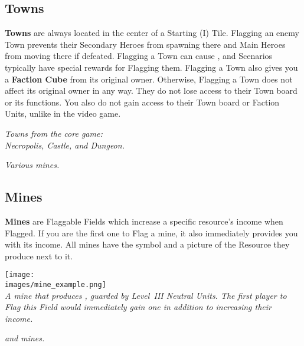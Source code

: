 \begin{multicols}{2}
\subsection*{Towns}
\textbf{Towns} are always located in the center of a Starting (I) Tile.
Flagging an enemy Town prevents their Secondary Heroes from spawning there and Main Heroes from moving there if defeated.
Flagging a Town can cause , and Scenarios typically have special rewards for Flagging them.
Flagging a Town also gives you a \textbf{Faction Cube} from its original owner.
Otherwise, Flagging a Town does not affect its original owner in any way.
They do not lose access to their Town board or its functions.
You also do not gain access to their Town board or Faction Units, unlike in the video game.

\begin{center}
  \textit{Towns from the core game:\\Necropolis, Castle, and Dungeon.}

  \vspace{1.8em}

  \textit{Various  mines.}
\end{center}

\columnbreak

\subsection*{Mines}
{\textbf{Mines}} are Flaggable Fields which increase a specific resource's income when Flagged.
If you are the first one to Flag a mine, it also immediately provides you with its income.
All mines have the  symbol and a picture of the Resource they produce next to it.

\begin{center}
  \texttt{[image: \\images/mine\_example.png]}\\
  \textit{A mine that produces , guarded by \mbox{Level III} Neutral Units.
    The first player to Flag this Field would immediately gain one  in addition to increasing their  income.
  }

  \vspace*{\fill}
  \textit{ and  mines.}
\end{center}
\end{multicols}


